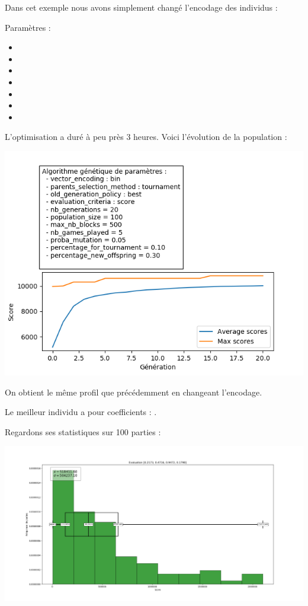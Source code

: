Dans cet exemple nous avons simplement changé l'encodage des individus :

Paramètres :
\begin{itemize}
	\item {}
	\item {}
	\item {}
	\item {}
	\item {}
	\item {}
	\item {}
\end{itemize} 

L'optimisation a duré à peu près 3 heures. Voici l'évolution de la population :

\includegraphics[scale=0.95]{media/results/AG10.png}

On obtient le même profil que précédemment en changeant l'encodage.

\medskip

Le meilleur individu a pour coefficients : \pyth{[0.2173, 0.4716, 0.9472, 0.1798]}.
\newpage

Regardons ses statistiques sur 100 parties :

\includegraphics[scale=0.35]{media/results/Stats_Eval_0,2173_0,4716_0,9472_0,1798.png}

